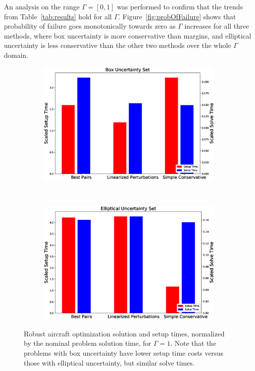 An analysis on the range $\Gamma=[0,1]$ was performed to confirm that the trends from
Table~\ref{tab:results} hold for all $\Gamma$. Figure~\ref{fig:probOfFailure}
shows that probability of failure goes monotonically
towards zero as $\Gamma$ increases for all three methods, where box uncertainty is
more conservative than margins, and elliptical uncertainty is less conservative
than the other two methods over the whole $\Gamma$ domain.

\begin{figure}[h!]
    \centering
    \captionsetup{justification=centering, font=small}
    \begin{subfigure}{0.49\textwidth}
        \centering
        \includegraphics[width=\linewidth]{box_sst.eps}
    \end{subfigure}
    ~
    \begin{subfigure}{0.49\textwidth}
        \centering
        \includegraphics[width=\linewidth]{ell_sst.eps}
    \end{subfigure}
    \caption{Robust aircraft optimization solution and setup times, normalized by the
    nominal problem solution time, for $\Gamma = 1$.
    Note that the problems with box uncertainty have lower setup
    time costs versus those with elliptical uncertainty, but similar solve times.}
    \label{compare_signomial}
\end{figure}

